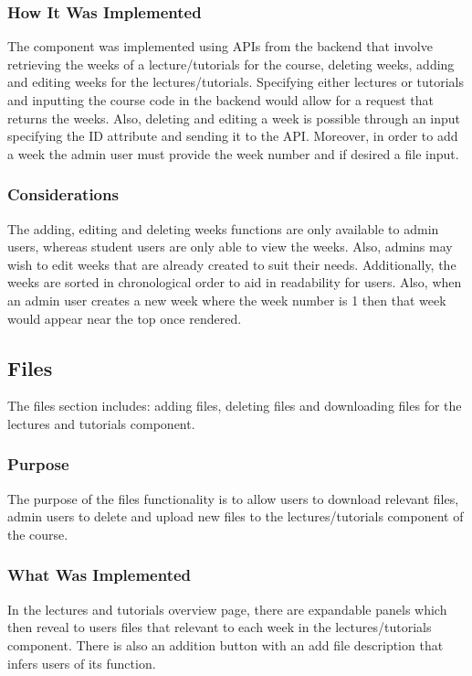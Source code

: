 \subsubsection{How It Was Implemented}
The component was implemented using APIs from the backend that involve retrieving the weeks of a lecture/tutorials for the course, deleting weeks, adding and editing weeks for the lectures/tutorials. Specifying either lectures or tutorials and inputting the course code in the backend would allow for a request that returns the weeks. Also, deleting and editing a week is possible through an input specifying the ID attribute and sending it to the API. Moreover, in order to add a week the admin user must provide the week number and if desired a file input. 

\subsubsection{Considerations}
The adding, editing and deleting weeks functions are only available to admin users, whereas student users are only able to view the weeks. Also, admins may wish to edit weeks that are already created to suit their needs. Additionally, the weeks are sorted in chronological order to aid in readability for users. Also, when an admin user creates a new week where the week number is 1 then that week would appear near the top once rendered.

\subsection{Files}
The files section includes: adding files, deleting files and downloading files for the lectures and tutorials component.

\subsubsection{Purpose}
The purpose of the files functionality is to allow users to download relevant files, admin users to delete and upload new files to the lectures/tutorials component of the course. 

\subsubsection{What Was Implemented}
In the lectures and tutorials overview page, there are expandable panels which then reveal to users files that relevant to each week in the lectures/tutorials component. There is also an addition button with an add file description that infers users of its function. 

